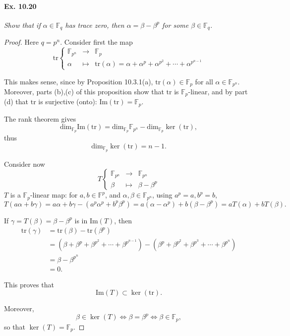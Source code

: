 \documentclass[11pt,a4paper]{article}
\newcommand{\F}{\mathbb{F}}
\begin{document}
\paragraph{Ex. 10.20} {\it Show that if $\alpha \in \F_q$ has trace zero, then $\alpha = \beta - \beta^p$ for some $\beta \in \F_q$.
}
\begin{proof}
Here $q = p^n$. Consider first the map
$$\mathrm{tr}
\left\{
\begin{array}{ccl}
\F_{p^n} & \to & \F_p\\
\alpha & \mapsto & \mathrm{tr}(\alpha) = \alpha + \alpha^p + \alpha^{p^2} + \cdots + \alpha^{p^{n-1}}
\end{array}
\right.
$$

This makes sense, since by Proposition 10.3.1(a), $\mathrm{tr}(\alpha) \in \F_p$ for all $\alpha \in \F_{p^n}$. Moreover, parts (b),(c) of this proposition show that $\mathrm{tr}$ is $\F_p$-linear, and by part (d) that $\mathrm{tr}$ is surjective (onto): $\mathrm{Im}(\mathrm{tr}) = \F_p$.

The rank theorem gives
$$\mathrm{dim}_{\F_p} \mathrm{Im}(\mathrm{tr}) = \mathrm{dim}_{\F_p} \F_{p^n} - \mathrm{dim}_{\F_p} \ker(\mathrm{tr}),$$
thus 
$$\mathrm{dim}_{\F_p} \ker(\mathrm{tr}) = n-1.$$

Consider now
$$
T 
\left\{
\begin{array}{ccl}
\F_{p^n} & \to& \F_{p^n}\\
\beta & \mapsto & \beta - \beta^p
\end{array}
\right.
$$
$T$ is a $\F_p$-linear map: for $a,b \in \F^p$, and $\alpha, \beta \in \F_{p^n}$, using $a^p = a, b^p = b$,
$$T(a \alpha + b \gamma) = a \alpha + b \gamma - (a^p \alpha^p +b^p \beta^p) = a (\alpha -\alpha^p) + b (\beta - \beta^p) = a T(\alpha) + b T(\beta).$$

If $\gamma = T(\beta) = \beta - \beta^p$ is in $\mathrm{Im}(T)$, then
\begin{align*}
\mathrm{tr}(\gamma) &= \mathrm{tr}(\beta) - \mathrm{tr}(\beta^p)\\
&=\left(\beta + \beta^p + \beta^{p^2} + \cdots + \beta^{p^{n-1}}\right) - \left(\beta^p + \beta^{p^2} + \beta^{p^3} + \cdots + \beta^{p^{n}}\right)\\
&=\beta - \beta^{p^n}\\
&=0.
\end{align*}

This proves that $$\mathrm{Im}(T) \subset \ker(\mathrm{tr}).$$

Moreover, 
$$\beta \in \ker(T) \iff \beta = \beta^p \iff \beta \in \F_p,$$
so that $\ker(T) = \F_p$.


\end{proof}
\end{document}
